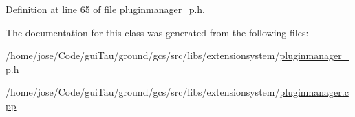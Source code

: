 Definition at line 65 of file pluginmanager\-\_\-p.\-h.



The documentation for this class was generated from the following files\-:\begin{DoxyCompactItemize}
\item 
/home/jose/\-Code/gui\-Tau/ground/gcs/src/libs/extensionsystem/\hyperlink{pluginmanager__p_8h}{pluginmanager\-\_\-p.\-h}\item 
/home/jose/\-Code/gui\-Tau/ground/gcs/src/libs/extensionsystem/\hyperlink{pluginmanager_8cpp}{pluginmanager.\-cpp}\end{DoxyCompactItemize}
